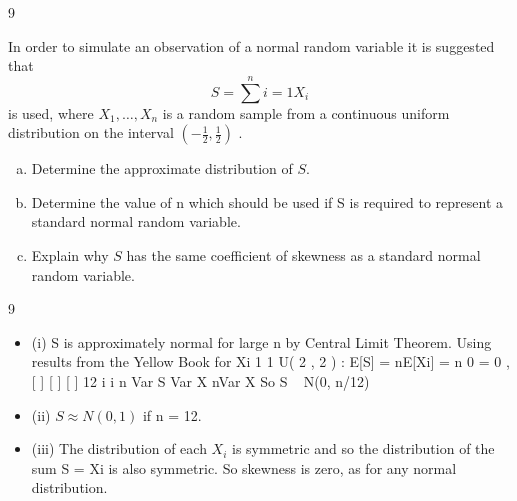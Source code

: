 \documentclass[a4paper,12pt]{article}
\begin{document}
9 

In order to simulate an observation of a normal random variable it is suggested that
\[S = \sum^{n}{i=1} X_i\]
is used, where $X_1, \ldots , X_n$ is a random sample from a continuous uniform distribution
on the interval $\displaystyle \left( -\frac{1}{2}, \frac{1}{2} \right)$ .
\begin{enumerate}[(a)]
    \item  Determine the approximate distribution of $S$. 
    \item Determine the value of n which should be used if S is required to represent a
standard normal random variable. 
    \item Explain why $S$ has the same coefficient of skewness as a standard normal
random variable. 
\end{enumerate}


\newpage
9 
\begin{itemize}
    \item (i) S is approximately normal for large n by Central Limit Theorem.
Using results from the Yellow Book for Xi
1 1
U( 2 , 2 ) :
E[S] = nE[Xi] = n 0 = 0 , [ ] [ ] [ ]
12 i i
n
Var S Var X nVar X
So S ~ N(0, n/12)
\item (ii) $S \approx N(0, 1)$ if n = 12.
\item (iii) The distribution of each $X_i$ is symmetric and so the distribution of the sum
S = Xi is also symmetric. So skewness is zero, as for any normal distribution.
\end{itemize}
\end{document}
